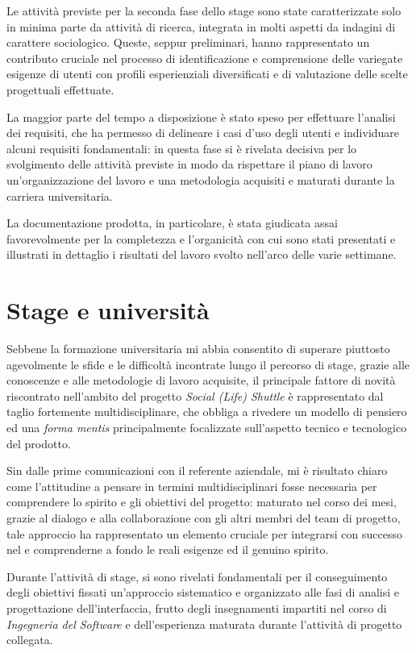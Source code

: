 Le attività previste per la seconda fase dello stage sono state caratterizzate solo in minima parte da attività di ricerca, integrata in molti aspetti da indagini di carattere sociologico. Queste, seppur preliminari, hanno rappresentato un contributo cruciale nel processo di identificazione e comprensione delle variegate esigenze di utenti con profili esperienziali diversificati e di valutazione delle scelte progettuali effettuate.

La maggior parte del tempo a disposizione è stato speso per effettuare l'analisi dei requisiti, che ha permesso di delineare i casi d'uso degli utenti e individuare alcuni requisiti fondamentali: in questa fase si è rivelata decisiva per lo svolgimento delle attività previste in modo da rispettare il piano di lavoro un'organizzazione del lavoro e una metodologia acquisiti e maturati durante la carriera universitaria.

La documentazione prodotta, in particolare, è stata giudicata assai favorevolmente per la completezza e l'organicità con cui sono stati presentati e illustrati in dettaglio i risultati del lavoro svolto nell'arco delle varie settimane.

\section{Stage e università}
Sebbene la formazione universitaria mi abbia consentito di superare piuttosto agevolmente le sfide e le difficoltà incontrate lungo il percorso di stage, grazie alle conoscenze e alle metodologie di lavoro acquisite, il principale fattore di novità riscontrato nell'ambito del progetto \textit{Social (Life) Shuttle} è rappresentato dal taglio fortemente multidisciplinare, che obbliga a rivedere un modello di pensiero ed una \textit{forma mentis} principalmente focalizzate sull'aspetto tecnico e tecnologico del prodotto.

Sin dalle prime comunicazioni con il referente aziendale, mi è risultato chiaro come l'attitudine a pensare in termini multidisciplinari fosse necessaria per comprendere lo spirito e gli obiettivi del progetto: maturato nel corso dei mesi, grazie al dialogo e alla collaborazione con gli altri membri del team di progetto, tale approccio ha rappresentato un elemento cruciale per integrarsi con successo nel e comprenderne a fondo le reali esigenze ed il genuino spirito.

Durante l'attività di stage, si sono rivelati fondamentali per il conseguimento degli obiettivi fissati un'approccio sistematico e organizzato alle fasi di analisi e progettazione dell'interfaccia, frutto degli insegnamenti impartiti nel corso di \textit{Ingegneria del Software} e dell'esperienza maturata durante l'attività di progetto collegata.

